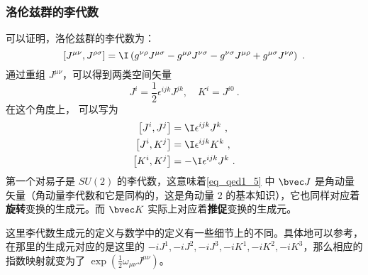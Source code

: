 \subsubsection{洛伦兹群的李代数}
可以证明，洛伦兹群的李代数为：
\begin{equation}\left[J^{\mu \nu}, J^{\rho \sigma}\right]=\I\left(g^{\nu \rho} J^{\mu \sigma}-g^{\mu \rho} J^{\nu \sigma}-g^{\nu \sigma} J^{\mu \rho}+g^{\mu \sigma} J^{\nu \rho}\right)~.\end{equation}
通过重组 $J^{\mu\nu}$，可以得到两类空间矢量
\begin{equation}\label{eq_qed1_5}J^{i}=\frac{1}{2} \epsilon^{i j k} J^{j k}, \quad K^{i}=J^{i 0}~.\end{equation}
在这个角度上， 可以写为
\begin{equation}\begin{aligned}
\left[J^{i}, J^{j}\right] &=\I \epsilon^{i j k} J^{k}~, \\
\left[J^{i}, K^{j}\right] &=\I \epsilon^{i j k} K^{k}~, \\
\left[K^{i}, K^{j}\right] &=-\I \epsilon^{i j k} J^{k}~.
\end{aligned}\end{equation}
第一个对易子是 $SU(2)$ 的李代数，这意味着\autoref{eq_qed1_5} 中 $\bvec J$ 是角动量矢量（角动量李代数和它是同构的，这是角动量 2 的基本知识），它也同样对应着\textbf{旋转}变换的生成元。而 $\bvec K$ 实际上对应着\textbf{推促}变换的生成元。

这里李代数生成元的定义与数学中的定义有一些细节上的不同。具体地可以参考，在那里的生成元对应的是这里的 $-iJ^1,-iJ^2,-iJ^3,-iK^1,-iK^2,-iK^3$，那么相应的指数映射就变为了 $\exp(\frac{1}{2}\omega_{\mu\nu}J^{\mu\nu})$。
